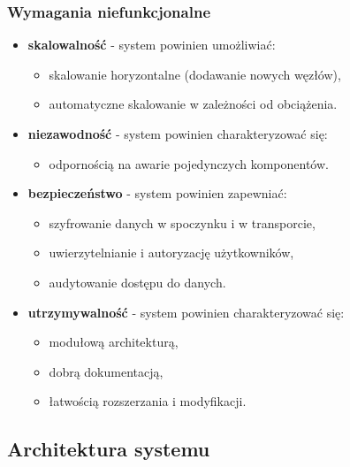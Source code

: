 \subsubsection{Wymagania niefunkcjonalne}
\label{subsubsec:wymagania_niefunkcjonalne}

\begin{itemize}
    
    \item \textbf{skalowalność} - system powinien umożliwiać:
    \begin{itemize}
        \item skalowanie horyzontalne (dodawanie nowych węzłów),
        \item automatyczne skalowanie w zależności od obciążenia.
    \end{itemize}
    
    \item \textbf{niezawodność} - system powinien charakteryzować się:
    \begin{itemize}
        \item odpornością na awarie pojedynczych komponentów.
    \end{itemize}
    
    \item \textbf{bezpieczeństwo} - system powinien zapewniać:
    \begin{itemize}
        \item szyfrowanie danych w spoczynku i w transporcie,
        \item uwierzytelnianie i autoryzację użytkowników,
        \item audytowanie dostępu do danych.
    \end{itemize}
    
    \item \textbf{utrzymywalność} - system powinien charakteryzować się:
    \begin{itemize}
        \item modułową architekturą,
        \item dobrą dokumentacją,
        \item łatwością rozszerzania i modyfikacji.
    \end{itemize}
\end{itemize}

\subsection{Architektura systemu}
\label{subsec:architektura}

